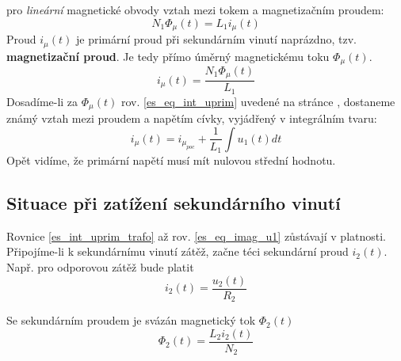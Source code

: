       pro \emph{lineární} magnetické obvody vztah mezi tokem a magnetizačním proudem:
      \begin{equation}\label{es_eq_stat_def_L}
        N_1\Phi_\mu(t)=L_1i_\mu(t)
      \end{equation}
      Proud $i_\mu(t)$ je primární proud při sekundárním vinutí naprázdno, tzv. 
      \textbf{magnetizační proud}. Je tedy přímo úměrný magnetickému toku $\Phi_\mu(t)$.
      \begin{equation}\label{es_eq_imag}
        i_\mu(t)=\frac{N_1\Phi_\mu(t)}{L_1}
      \end{equation}
      Dosadíme-li za $\Phi_\mu(t)$ rov. \ref{es_eq_int_uprim} uvedené na stránce 
      \pageref{es_eq_int_uprim}, dostaneme známý vztah mezi proudem a napětím cívky, vyjádřený v
      integrálním tvaru:
      \begin{equation}\label{es_eq_imag_u1}
        i_\mu(t)=i_{\mu_{poc}}+\frac{1}{L_1}\int{u_1(t)dt}
      \end{equation}
      Opět vidíme, že primární napětí musí mít nulovou střední hodnotu.
      
    \subsection{Situace při zatížení sekundárního vinutí}
      Rovnice \ref{es_int_uprim_trafo} až rov. \ref{es_eq_imag_u1} zůstávají v platnosti. 
      Připojíme-li k sekundárnímu vinutí zátěž, začne téci sekundární proud $i_2(t)$. Např. pro 
      odporovou zátěž bude platit
      \begin{equation}\label{es:eq_i2}
        i_2(t)=\frac{u_2(t)}{R_2}
      \end{equation}

      Se sekundárním proudem je svázán magnetický tok $\Phi_2(t)$
      \begin{equation}\label{es:eq_tok_phi2}
        \Phi_2(t)=\frac{L_2i_2(t)}{N_2}
      \end{equation}

      \begin{figure}[ht!]
        \centering
          {}   \\
          {}             
        \caption{ }
        \label{ES:fig_004}
      \end{figure}
      
